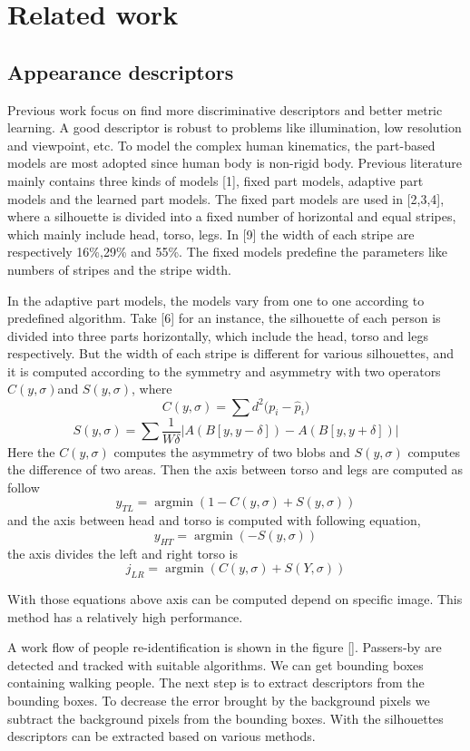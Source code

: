 \chapter{Related work}


\section{Appearance descriptors}
Previous work focus on find more discriminative descriptors and better metric learning. A good descriptor is robust to problems like illumination, low resolution and viewpoint, etc.
To model the complex human kinematics, the part-based models are most adopted since human body is non-rigid body. Previous literature mainly contains three kinds of models [1], fixed part models, adaptive part models and the learned part models. The fixed part models are used in [2,3,4], where a silhouette is divided into a fixed number of horizontal and equal stripes, which mainly include head, torso, legs. In [9] the width of each stripe are respectively 16\%,29\% and 55\%.  The fixed models predefine the parameters like numbers of stripes and the stripe width. 

In the adaptive part models, the models vary from one to one according to predefined algorithm. Take [6] for an instance, the silhouette of each person is divided into three parts horizontally, which include the head, torso and legs respectively. But the width of each stripe is different for various silhouettes, and it is computed according to the symmetry and asymmetry with two operators $C(y, \sigma) $and $S(y,\sigma)$, where 
$$C(y,\sigma) = \sum{d^2(p_i-{\hat{p}_i)}}$$
$$S(y,\sigma) = \sum{\frac{1}{W\delta}|A(B[y,y-\delta]) - A(B[y,y+\delta])|}$$
Here the $C(y, \sigma) $ computes the asymmetry of two blobs and $S(y,\sigma)$ computes the difference of two areas. Then the axis between torso and legs are computed as follow
$$y_{TL} = \mathop{\arg\min}(1-C(y,\sigma)+S(y,\sigma))$$
and the axis  between head and torso is computed with following equation,
$$y_{HT} = \mathop{\arg\min}(-S(y,\sigma))$$
the axis divides the left and right torso is
$$ j_{LR} = \mathop{\arg\min}(C(y,\sigma)+S(Y,\sigma))$$

With those equations above axis can be computed depend on specific image. This method has a relatively high performance.

A work flow of people re-identification is shown in the figure []. Passers-by are detected and tracked with suitable algorithms. We can get bounding boxes containing walking people. The next step is to extract descriptors from the bounding boxes. To decrease the error brought by the background pixels we subtract the background pixels from the bounding boxes. With the silhouettes descriptors can be extracted based on various methods.  

